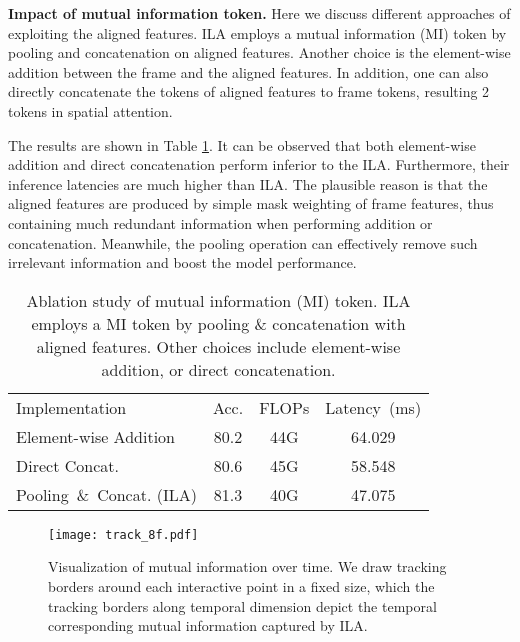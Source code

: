 \documentclass[10pt,twocolumn,letterpaper]{article}
\begin{document}
\vspace{0.05in}
\noindent\textbf{Impact of mutual information token.}
Here we discuss different approaches of exploiting the aligned features.
ILA employs a mutual information (MI) token by pooling and concatenation on aligned features.
Another choice is the element-wise addition between the frame and the aligned features.
In addition, one can also directly concatenate the tokens of aligned features to frame tokens, resulting 2 tokens in spatial attention.


The results are shown in Table \ref{table:10}. 
It can be observed that both element-wise addition and direct concatenation perform inferior to the ILA.
Furthermore, their inference latencies are much higher than ILA.
The plausible reason is that the aligned features are produced by simple mask weighting of frame features, thus containing much redundant information when performing addition or concatenation.
Meanwhile, the pooling operation can effectively remove such irrelevant information and boost the model performance.
\begin{table}[htbp]\small
\caption{Ablation study of mutual information (MI) token. ILA employs a MI token by pooling \& concatenation with aligned features.
Other choices include element-wise addition, or direct concatenation.}
\vspace{-0.2cm}
\begin{center}
\renewcommand\arraystretch{1.2}
\begin{tabular}{lccc}
\toprule
Implementation & Acc. & FLOPs & Latency~(ms) \\ 
\cmidrule(lr){1-1} \cmidrule(lr){2-2} \cmidrule(lr){3-3} \cmidrule(lr){4-4}
Element-wise Addition    & 80.2     & 44G   & 64.029                \\
Direct Concat. & 80.6     & 45G   & 58.548                \\
Pooling~\&~Concat. (ILA)      & 81.3     & 40G   & 47.075                \\ \bottomrule
\end{tabular}
\end{center}
\label{table:10}
\vspace{-0.2in}
\end{table}

\begin{figure*}[t!]
\begin{center}
\texttt{[image: track\_8f.pdf]}
\end{center}
  \caption{Visualization of mutual information over time. We draw tracking borders around each interactive point in a fixed size, which the tracking borders along temporal dimension depict the temporal corresponding mutual information captured by ILA.}
\label{fig:track}
\end{figure*}
\end{document}
